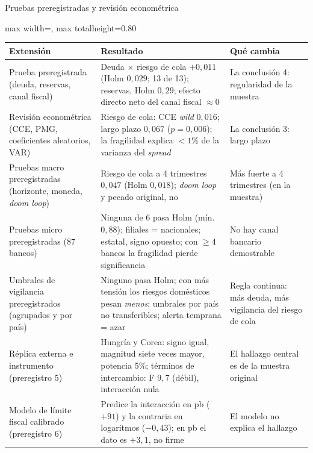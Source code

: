 \documentclass[aspectratio=169]{beamer}
\begin{document}
\begin{frame}{Pruebas preregistradas y revisión econométrica}
\centering
\footnotesize
\begin{adjustbox}{max width=\textwidth, max totalheight=0.80\textheight}
\begin{tabular}{>{\raggedright\arraybackslash}p{}>{\raggedright\arraybackslash}p{}>{\raggedright\arraybackslash}p{}}
\toprule
Extensión & Resultado & Qué cambia \\
\midrule
Prueba preregistrada (deuda, reservas, canal fiscal) & Deuda $\times$ riesgo de cola $+0{,}011$ (Holm $0{,}029$; 13 de 13); reservas, Holm $0{,}29$; efecto directo neto del canal fiscal $\approx0$ & La conclusión 4: regularidad de la muestra \\
\addlinespace
Revisión econométrica (CCE, PMG, coeficientes aleatorios, VAR) & Riesgo de cola: CCE \textit{wild} $0{,}016$; largo plazo $0{,}067$ ($p=0{,}006$); la fragilidad explica $<1\%$ de la varianza del \textit{spread} & La conclusión 3: largo plazo \\
\addlinespace
Pruebas macro preregistradas (horizonte, moneda, \textit{doom loop}) & Riesgo de cola a 4 trimestres $0{,}047$ (Holm $0{,}018$); \textit{doom loop} y pecado original, no & Más fuerte a 4 trimestres (en la muestra) \\
\addlinespace
Pruebas micro preregistradas (87 bancos) & Ninguna de 6 pasa Holm (mín.\ $0{,}88$); filiales = nacionales; estatal, signo opuesto; con $\geq4$ bancos la fragilidad pierde significancia & No hay canal bancario demostrable \\
\addlinespace
Umbrales de vigilancia preregistrados (agrupados y por país) & Ninguno pasa Holm; con más tensión los riesgos domésticos pesan \emph{menos}; umbrales por país no transferibles; alerta temprana = azar & Regla continua: más deuda, más vigilancia del riesgo de cola \\
\addlinespace
Réplica externa e instrumento (preregistro 5) & Hungría y Corea: signo igual, magnitud siete veces mayor, potencia 5\%; términos de intercambio: F $9{,}7$ (débil), interacción nula & El hallazgo central es de la muestra original \\
\addlinespace
Modelo de límite fiscal calibrado (preregistro 6) & Predice la interacción en pb ($+91$) y la contraria en logaritmos ($-0{,}43$); en pb el dato es $+3{,}1$, no firme & El modelo no explica el hallazgo \\
\bottomrule
\end{tabular}
\end{adjustbox}
\end{frame}
\end{document}
